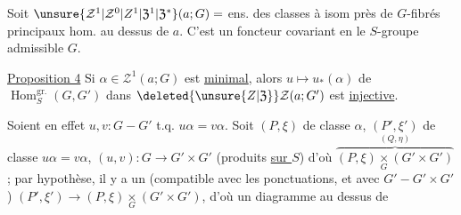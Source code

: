  Soit $\unsure{\mathcal Z^{1}|\mathcal Z^{0}|Z^{1}|\mathfrak Z^{1}|\mathfrak Z^{*}}(a;G)=$ ens. des classes à isom
près de $G$-fibrés principaux hom. \uline{} au
dessus de $a$. C'est un foncteur covariant en
le $S$-groupe admissible $G$.

\uline{Proposition 4} Si $\alpha\in\mathcal Z^{1}(a;G)$ est \uline{minimal},
alors $u\longmapsto u_{*}(\alpha)$ de $\operatorname{Hom}^{\mathrm{gr}.}_{S}(G,G')$ dans
$\deleted{\unsure{Z|\mathfrak Z}}\mathcal Z(a;G')$ est \uline{injective}.

Soient en effet $u,v:G\mathbin{-}G'$ t.q.
$u\alpha=v\alpha$. Soit $(P,\xi)$ de classe $\alpha$,
$(P',\xi')$ de classe $u\alpha=v\alpha$, $(u,v):G\to G'\times G'$ 
(produits \uline{sur $S$}) d'où $\overbrace{(P,\xi)\mathbin{\underset{G}{\times}}(G'\times G')}^{(Q,\eta)}$ ;
par hypothèse, il y a un 
(compatible avec les ponctuations, et avec 
$G'\mathbin{-}G'\times G'$) $(P',\xi')\longrightarrow(P,\xi)\mathbin{\underset{G}{\times}}(G'\times G')$, d'où
un diagramme
au dessus de
